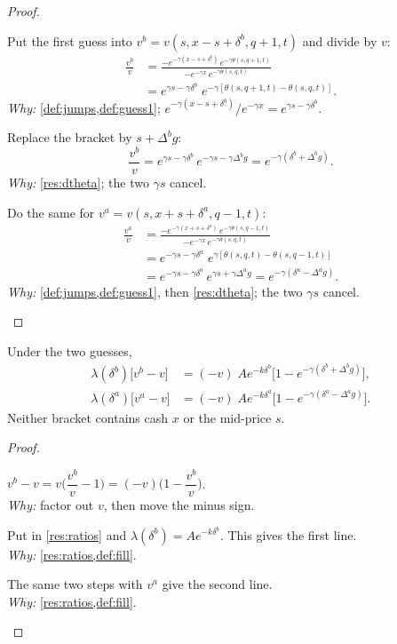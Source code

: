 \begin{proof}
\begin{steps}
  \item Put the first guess into $v^b=v(s,x-s+\delta^b,q+1,t)$ and divide by $v$:
  \[
    \begin{aligned}
      \frac{v^b}{v}
      &=\frac{-e^{-\gamma(x-s+\delta^b)}\,e^{-\gamma\theta(s,q+1,t)}}{-e^{-\gamma x}\,e^{-\gamma\theta(s,q,t)}}\\
      &=e^{\gamma s-\gamma\delta^b}\;e^{-\gamma\left[\theta(s,q+1,t)-\theta(s,q,t)\right]}.
    \end{aligned}
  \]
  \emph{Why:} \cref{def:jumps,def:guess1}; $e^{-\gamma(x-s+\delta^b)}/e^{-\gamma x}=e^{\gamma s-\gamma\delta^b}$.
  \item Replace the bracket by $s+\Delta^bg$:
  \[
    \frac{v^b}{v}=e^{\gamma s-\gamma\delta^b}\,e^{-\gamma s-\gamma\Delta^bg}=e^{-\gamma(\delta^b+\Delta^bg)}.
  \]
  \emph{Why:} \cref{res:dtheta}; the two $\gamma s$ cancel.
  \item Do the same for $v^a=v(s,x+s+\delta^a,q-1,t)$:
  \[
    \begin{aligned}
      \frac{v^a}{v}
      &=\frac{-e^{-\gamma(x+s+\delta^a)}\,e^{-\gamma\theta(s,q-1,t)}}{-e^{-\gamma x}\,e^{-\gamma\theta(s,q,t)}}\\
      &=e^{-\gamma s-\gamma\delta^a}\;e^{\gamma\left[\theta(s,q,t)-\theta(s,q-1,t)\right]}\\
      &=e^{-\gamma s-\gamma\delta^a}\,e^{\gamma s+\gamma\Delta^ag}=e^{-\gamma(\delta^a-\Delta^ag)}.
    \end{aligned}
  \]
  \emph{Why:} \cref{def:jumps,def:guess1}, then \cref{res:dtheta}; the two $\gamma s$ cancel.
\end{steps}
\end{proof}

\begin{result}
\label{res:jump}
Under the two guesses,
\[
  \begin{aligned}
    \lambda(\delta^b)\big[v^b-v\big]&=(-v)\;Ae^{-k\delta^b}\big[1-e^{-\gamma(\delta^b+\Delta^bg)}\big],\\
    \lambda(\delta^a)\big[v^a-v\big]&=(-v)\;Ae^{-k\delta^a}\big[1-e^{-\gamma(\delta^a-\Delta^ag)}\big].
  \end{aligned}
\]
Neither bracket contains cash $x$ or the mid-price $s$.
\end{result}

\begin{proof}
\begin{steps}
  \item $v^b-v=v\Big(\dfrac{v^b}{v}-1\Big)=(-v)\Big(1-\dfrac{v^b}{v}\Big)$.
  \\ \emph{Why:} factor out $v$, then move the minus sign.
  \item Put in \cref{res:ratios} and $\lambda(\delta^b)=Ae^{-k\delta^b}$. This gives the first line.
  \\ \emph{Why:} \cref{res:ratios,def:fill}.
  \item The same two steps with $v^a$ give the second line.
  \\ \emph{Why:} \cref{res:ratios,def:fill}.
\end{steps}
\end{proof}

